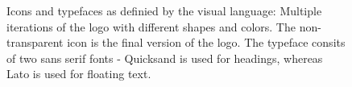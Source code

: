 \documentclass[12pt,numbers=noenddot,parskip,bibliography=totocnumbered,listof=totocnumbered,draft=true]{scrreprt}
\begin{document}
\begin{figure}
\qquad
{}
\caption[Screenshots of the organisation of interest groups]{Icons and typefaces as definied by the visual language: Multiple iterations of the logo  with different shapes and colors. The non-transparent icon is the final version of the logo. The typeface  consits of two sans serif fonts - Quicksand is used for headings, whereas Lato is used for floating text.}
\end{figure}
%
\end{document}
